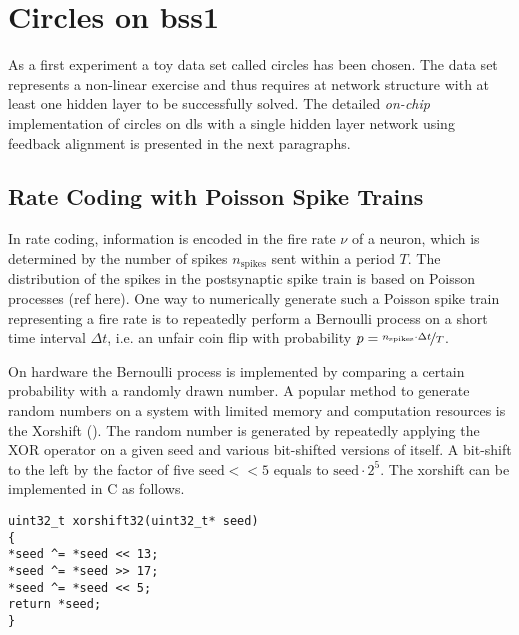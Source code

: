 \section{Circles on \gls{bss1}}
As a first experiment a toy data set called circles has been chosen. The data set represents a non-linear exercise and thus requires at network structure with at least one hidden layer to be successfully solved. The detailed \textit{on-chip} implementation of circles on \gls{dls} with a single hidden layer network using feedback alignment is presented in the next paragraphs.




\subsection{Rate Coding with Poisson Spike Trains}

In rate coding, information is encoded in the fire rate $\nu$ of a neuron, which is determined by the number of spikes $n_\text{spikes}$ sent within a period $T$. The distribution of the spikes in the postsynaptic spike train is based on Poisson processes (ref here). One way to numerically generate such a Poisson spike train representing a fire rate is to repeatedly perform a Bernoulli process on a short time interval $\Delta t$, i.e. an unfair coin flip with probability $p = \nicefrac{n_\text{spikes} \cdot \Delta t}{T}$.

On hardware the Bernoulli process is implemented by comparing a certain probability with a randomly drawn number. A popular method to generate random numbers on a system with limited memory and computation resources is the Xorshift (\cite{marsaglia2003xorshift}). The random number is generated by repeatedly applying the XOR operator on a given seed and various bit-shifted versions of itself. A bit-shift to the left by the factor of five $\text{seed} << 5$ equals to $\text{seed} \cdot 2^5$. The xorshift can be implemented in C as follows.

\begin{verbatim}
uint32_t xorshift32(uint32_t* seed)
{
*seed ^= *seed << 13;
*seed ^= *seed >> 17;
*seed ^= *seed << 5;
return *seed;
}
\end{verbatim}


